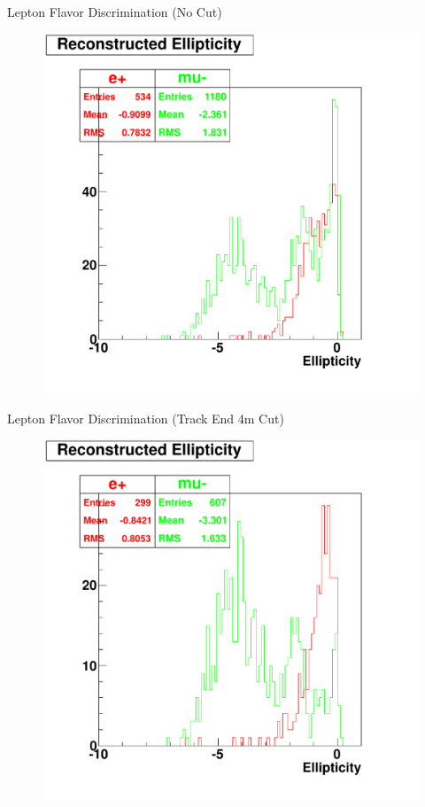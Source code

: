 \documentclass{beamer} %
\begin{document}
\begin{frame}{Lepton Flavor Discrimination (No Cut)}
	\begin{figure}
		\includegraphics[width=\textwidth,height=0.9\textheight,keepaspectratio]
			{material/emu_mtq_recon_ellipticity-nocut.pdf}
	\end{figure}
\end{frame}

\begin{frame}{Lepton Flavor Discrimination (Track End 4m  Cut)}
	\begin{figure}
		\includegraphics[width=\textwidth,height=0.9\textheight,keepaspectratio]
			{material/emu_mtq_recon_ellipticity-4Mcut.pdf}
	\end{figure}
\end{frame}
\end{document}
